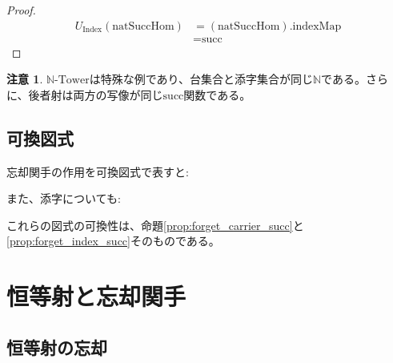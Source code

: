 \documentclass[a4paper,12pt]{article}
\theoremstyle{definition}
\newtheorem{remark}[definition]{注意}
\begin{document}
\begin{proof}
\begin{align*}
U_{\text{Index}}(\text{natSuccHom}) &= (\text{natSuccHom}).\text{indexMap} \\
&= \text{succ}
\end{align*}
\end{proof}

\begin{remark}
$\mathbb{N}\text{-Tower}$は特殊な例であり、台集合と添字集合が同じ$\mathbb{N}$である。さらに、後者射は両方の写像が同じ$\text{succ}$関数である。
\end{remark}

\subsection{可換図式}

忘却関手の作用を可換図式で表すと:

\begin{center}
\end{center}

また、添字についても:

\begin{center}
\end{center}

これらの図式の可換性は、命題\ref{prop:forget_carrier_succ}と\ref{prop:forget_index_succ}そのものである。

\section{恒等射と忘却関手}

\subsection{恒等射の忘却}
\end{document}
